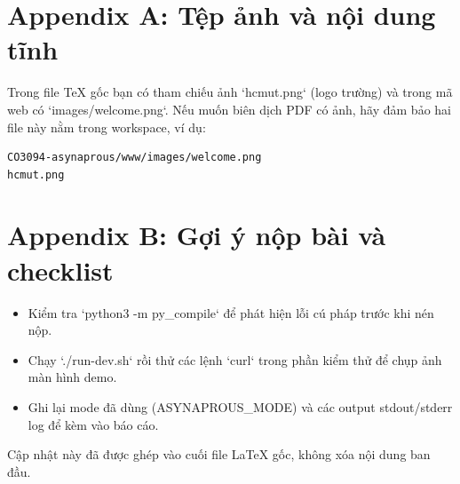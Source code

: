\documentclass[a4paper,12pt]{article}
\begin{document}
\section{Appendix A: Tệp ảnh và nội dung tĩnh}
Trong file TeX gốc bạn có tham chiếu ảnh `hcmut.png` (logo trường) và trong mã web có `images/welcome.png`. Nếu muốn biên dịch PDF có ảnh, hãy đảm bảo hai file này nằm trong workspace, ví dụ:
\begin{verbatim}
CO3094-asynaprous/www/images/welcome.png
hcmut.png
\end{verbatim}

\section{Appendix B: Gợi ý nộp bài và checklist}
\begin{itemize}
  \item Kiểm tra `python3 -m py_compile` để phát hiện lỗi cú pháp trước khi nén nộp.
  \item Chạy `./run-dev.sh` rồi thử các lệnh `curl` trong phần kiểm thử để chụp ảnh màn hình demo.
  \item Ghi lại mode đã dùng (ASYNAPROUS_MODE) và các output stdout/stderr log để kèm vào báo cáo.
\end{itemize}

\bigskip
\noindent Cập nhật này đã được ghép vào cuối file LaTeX gốc, không xóa nội dung ban đầu.
\end{document}
